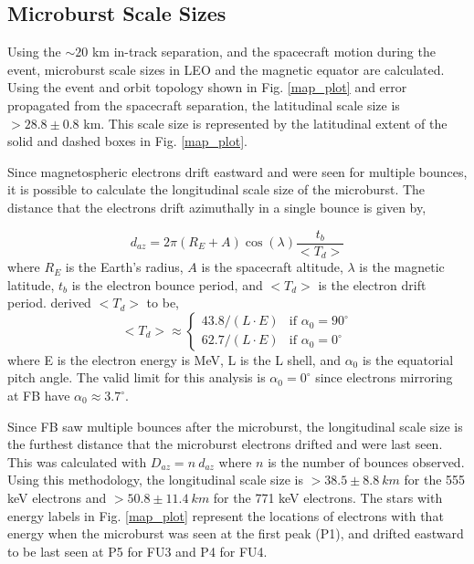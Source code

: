 \documentclass[draft,linenumbers]{agujournal}
\begin{document}
\subsection{Microburst Scale Sizes} \label{scale_size} %
Using the $\sim 20$ km in-track separation, and the spacecraft motion during the event, microburst scale sizes in LEO and the magnetic equator are calculated. Using the event and orbit topology shown in Fig. \ref{map_plot} and error propagated from the spacecraft separation, the latitudinal scale size is $ > 28.8 \pm 0.8$ km. This scale size is represented by the latitudinal extent of the solid and dashed boxes in Fig. \ref{map_plot}.

Since magnetospheric electrons drift eastward and were seen for multiple bounces, it is possible to calculate the longitudinal scale size of the microburst. The distance that the electrons drift azimuthally in a single bounce is given by, 

\begin{equation}
d_{az} = 2 \pi (R_E + A) \cos(\lambda) \frac{t_b}{<T_{d}>}
\label{bounce_drift}
\end{equation} where $R_E$ is the Earth's radius, $A$ is the spacecraft altitude, $\lambda$ is the magnetic latitude, $t_b$ is the electron bounce period, and $<T_{d}>$ is the electron drift period. \citet{Parks03} derived $<T_{d}>$ to be,
\begin{equation}
<T_{d}> \approx
\begin{cases}
43.8 /(L \cdot E) & \text{if } \alpha_0 = 90^{\circ} \\    62.7/(L \cdot E) & \text{if } \alpha_0 = 0^{\circ}
\end{cases}
\label{drift}
\end{equation} where E is the electron energy is MeV, L is the L shell, and $\alpha_0$ is the equatorial pitch angle. The valid limit for this analysis is $\alpha_0 = 0^{\circ}$ since electrons mirroring at FB have $\alpha_0 \approx 3.7^{\circ}$. 

Since FB saw multiple bounces after the microburst, the longitudinal scale size is the furthest distance that the microburst electrons drifted and were last seen. This was calculated with $D_{az} = n \ d_{az}$ where $n$ is the number of bounces observed. Using this methodology, the longitudinal scale size is $ > 38.5 \pm 8.8 \ km$ for the 555 keV electrons and $ > 50.8 \pm 11.4 \ km$ for the 771 keV electrons. The stars with energy labels in Fig. \ref{map_plot} represent the locations of electrons with that energy when the microburst was seen at the first peak (P1), and drifted eastward to be last seen at P5 for FU3 and P4 for FU4.
\end{document}
